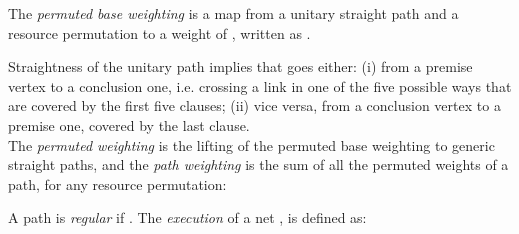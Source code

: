 \begin{definition}[Weighting]\label{def:RIN:weight}
  The \textit{permuted base weighting} is a map 
  from a unitary straight path 
    and a resource permutation 
  to a weight of , written as .
  
  Straightness of the unitary path  implies that  goes either:
  (i) from a premise vertex to a conclusion one, i.e. crossing a link in one of 
  the five possible ways that are covered by the first five clauses;
  (ii) vice versa, from a conclusion vertex to a premise one, covered by the 
  last clause.\\
  The \textit{permuted weighting} is the lifting of the permuted base weighting 
  to generic straight paths, and the \textit{path weighting} is the sum of all 
  the permuted weights of a path, for any resource permutation:
  
\end{definition}

\begin{definition}[Execution]
\label{def:RIN:path:compr}
A path  is \textit{regular} if .
The \textit{execution} of a net , is defined as:

\end{definition}


